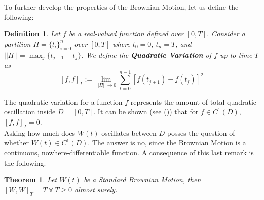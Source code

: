 \documentclass[11pt]{report}
\newtheorem{definition}{Definition}[chapter]
\newtheorem{theorem}{Theorem}
\newcommand{\aycite}[1]{%
 \citeauthor{#1} (\citeyear{#1})}
\begin{document}
To further develop the properties of the Brownian Motion, let us define the following:
\begin{definition}\label{def:quadratic_variation}
	Let $f$ be a real-valued function defined over $[0, T]$. Consider a partition $\Pi= \{t_i\}_{i=0}^{n}$ over $[0, T]$ where $t_0 = 0$, $t_n = T$, and $||\Pi|| = \max_j\{t_{j+1} - t_j\}$. We define the \textbf{Quadratic Variation} of $f$ up to time $T$ as
	\[
		[f, f]_T := \lim_{||\Pi|| \to 0} \sum_{t=0}^{n-1}\left[f(t_{j+1}) - f(t_{j})\right]^2
	\]
\end{definition}


The quadratic variation for a function $f$ represents the amount of total quadratic oscillation inside $D = [0,T]$. It can be shown (see \aycite{shreve}) that for $f \in C^1(D)$, $[f,f]_T = 0$.\\

Asking how much does $W(t)$ oscillates between $D$ posses the question of whether $W(t) \in C^1(D)$. The answer is no, since the Brownian Motion is a continuous, nowhere-differentiable function. A consequence of this last remark is the following.

\begin{theorem}\label{th:quadratic_brownian_motion}
	Let $W(t)$ be a Standard Brownian Motion, then $[W, W]_T = T \ \forall \ T \geq 0$ almost surely.
\end{theorem}
\end{document}
